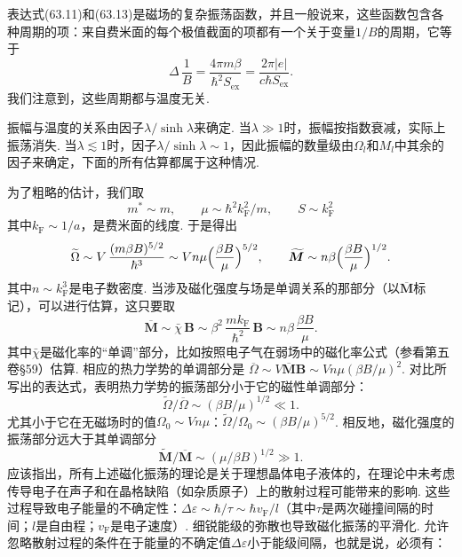 表达式(63.11)和(63.13)是磁场的复杂振荡函数，并且一般说来，这些函数包含各种周期的项：来自费米面的每个极值截面的项都有一个关于变量$1/B$的周期，它等于
\begin{equation}
\Delta\,\frac{1}{B}=\frac{4\pi m\beta}{\hbar^2S_{\mathrm{ex}}}
=\frac{2\pi|e|}{c\hbar S_{\mathrm{ex}}}.
\end{equation}
我们注意到，这些周期都与温度无关.

振幅与温度的关系由因子$\lambda/\sinh\lambda$来确定. 当$\lambda\gg1$时，振幅按指数衰减，实际上振荡消失. 当$\lambda\lesssim1$时，因子$\lambda/\sinh\lambda\sim1$，因此振幅的数量级由$\Omega_l$和$M_l$中其余的因子来确定，下面的所有估算都属于这种情况.

为了粗略的估计，我们取
\begin{equation*}
m^*\sim m,\qquad \mu\sim\hbar^2k^2_{\mathrm F}/m,\qquad S\sim k^2_{\mathrm F}
\end{equation*}
其中$k_{\mathrm F}\sim1/a$，是费米面的线度. 于是得出
\begin{equation}
\widetilde{\Omega}\sim V\,\frac{(m\beta B)^{5/2}}{\hbar^3}
\sim Vn\mu\Bigl(\frac{\beta B}{\mu}\Bigr)^{5/2},\qquad
\widetilde{\bm{M}}\sim n\beta\Bigl(\frac{\beta B}{\mu}\Bigr)^{1/2}.
\end{equation}
其中$n\sim k^3_{\mathrm F}$是电子数密度. 当涉及磁化强度与场是单调关系的那部分（以$\overline{\bm{M}}$标记），可以进行估算，这只要取
\begin{equation}
\overline{\bm{M}}\sim\bar{\chi}\,\bm{B}\sim\beta^2\,\frac{mk_{\mathrm F}}{\hbar^2}\,\bm{B}
\sim n\beta\,\frac{\beta B}{\mu}.
\end{equation}
其中$\bar{\chi}$是磁化率的“单调”部分，比如按照电子气在弱场中的磁化率公式（参看第五卷§59）估算. 相应的热力学势的单调部分是
$\overline{\Omega}\sim V\overline{\bm{M}}\bm{B}\sim Vn\mu(\beta B/\mu)^2$. 对比所写出的表达式，表明热力学势的振荡部分小于它的磁性单调部分：
\begin{equation*}
\widetilde{\Omega}/\overline{\Omega}\sim(\beta B/\mu)^{1/2}\ll1.
\end{equation*}
尤其小于它在无磁场时的值$\Omega_0\sim Vn\mu$：$\widetilde{\Omega}/\Omega_0\sim(\beta B/\mu)^{5/2}$. 相反地，磁化强度的振荡部分远大于其单调部分
\begin{equation*}
\widetilde{\bm{M}}/\overline{\bm{M}}\sim(\mu/\beta B)^{1/2}\gg1.
\end{equation*}
应该指出，所有上述磁化振荡的理论是关于理想晶体电子液体的，在理论中未考虑传导电子在声子和在晶格缺陷（如杂质原子）上的散射过程可能带来的影响. 这些过程导致电子能量的不确定性：$\Delta\varepsilon\sim\hbar/\tau\sim\hbar v_{\mathrm F}/l$（其中$\tau$是两次碰撞间隔的时间；$l$是自由程；$v_{\mathrm F}$是电子速度）. 细锐能级的弥散也导致磁化振荡的平滑化. 允许忽略散射过程的条件在于能量的不确定值$\Delta\varepsilon$小于能级间隔，也就是说，必须有：
